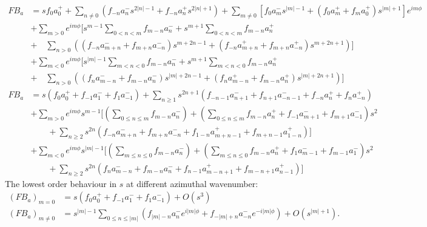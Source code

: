 \begin{equation}
\begin{aligned}
    F B_a &= s f_0 a_0^+ + \sum_{n\neq 0} \left(f_{-n} a_n^- s^{2|n|-1} + f_{-n} a_n^+ s^{2|n|+1}\right) + \sum_{m\neq 0} \left[f_0 a_{m}^- s^{|m|-1} + \left(f_0 a_m^+ + f_m a_0^+\right) s^{|m|+1}\right] e^{im\phi} \\
    &+ \sum_{m > 0} e^{im\phi} \Bigg[s^{m-1} \sum_{0<n<m} f_{m-n} a_n^- + s^{m+1} \sum_{0<n<m} f_{m-n} a_n^+ \\
    &+\quad  \sum_{n>0} \left(\left(f_{-n} a_{m+n}^- + f_{m+n} a_{-n}^- \right) s^{m+2n-1} + \left(f_{-n} a_{m+n}^+ + f_{m+n} a_{-n}^+ \right) s^{m+2n+1} \right) \Bigg] \\
    &+ \sum_{m < 0} e^{im\phi} \Bigg[s^{|m|-1} \sum_{m<n<0} f_{m-n} a_n^- + s^{m+1} \sum_{m<n<0} f_{m-n} a_n^+ \\
    &+\quad  \sum_{n>0} \left(\left(f_{n} a_{m-n}^- + f_{m-n} a_{n}^- \right) s^{|m|+2n-1} + \left(f_{n} a_{m-n}^+ + f_{m-n} a_{n}^+ \right) s^{|m|+2n+1} \right) \Bigg] \\
    F B_a &= s \left(f_0 a_0^+ + f_{-1} a_1^- + f_1 a_{-1}^-\right) + \sum_{n\geq 1} s^{2n+1} \left(f_{-n-1} a_{n+1}^- + f_{n+1} a_{-n-1}^- + f_{-n} a_n^+ + f_n a_{-n}^+ \right) \\
    &+ \sum_{m > 0} e^{im\phi} s^{m-1} \Bigg[ \left(\sum_{0\leq n\leq m} f_{m-n} a_n^-\right) + \left(\sum_{0\leq n\leq m} f_{m-n} a_n^+ + f_{-1}a_{m+1}^- + f_{m+1} a_{-1}^- \right) s^2 \\
    &\qquad + \sum_{n\geq 2} s^{2n} \left(f_{-n} a_{m+n}^- + f_{m+n} a_{-n}^- + f_{1-n} a_{m+n-1}^+ + f_{m+n-1} a_{1-n}^+\right) \Bigg] \\ 
    &+ \sum_{m < 0} e^{im\phi} s^{|m|-1} \Bigg[ \left(\sum_{m\leq n\leq 0} f_{m-n} a_n^-\right) + \left(\sum_{m\leq n\leq 0} f_{m-n} a_n^+ + f_{1}a_{m-1}^- + f_{m-1} a_{1}^- \right) s^2 \\
    &\qquad + \sum_{n\geq 2} s^{2n} \left(f_{n} a_{m-n}^- + f_{m-n} a_{n}^- + f_{n-1} a_{m-n+1}^+ + f_{m-n+1} a_{n-1}^+\right) \Bigg]
\end{aligned}
\end{equation}
The lowest order behaviour in $s$ at different azimuthal wavenumber:
\begin{equation}
\begin{aligned}
    (FB_a)_{m=0} &= s \left(f_0 a_0^+ + f_{-1} a_1^- + f_1 a_{-1}^-\right) + O(s^3) \\ 
    (FB_a)_{m\neq 0} &= s^{|m|-1} \sum_{0\leq n \leq |m|} \left( f_{|m|-n} a_n^- e^{i|m|\phi} + f_{-|m|+n} a_{-n}^- e^{-i|m|\phi}\right) + O(s^{|m|+1}).
\end{aligned}
\end{equation}

